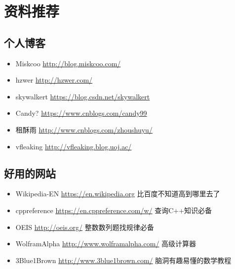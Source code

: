 \chapter{资料推荐}
\section{个人博客}
\begin{itemize}
	\item Miskcoo \url{http://blog.miskcoo.com/}
	\item hzwer \url{http://hzwer.com/}
    \item skywalkert \url{https://blog.csdn.net/skywalkert}
    \item Candy? \url{https://www.cnblogs.com/candy99}
    \item 租酥雨 \url{http://www.cnblogs.com/zhoushuyu/}
    \item vfleaking \url{http://vfleaking.blog.uoj.ac/}
\end{itemize}
\section{好用的网站}
\begin{itemize}
    \item Wikipedia-EN \url{https://en.wikipedia.org} 比百度不知道高到哪里去了
    \item cppreference \url{https://en.cppreference.com/w/} 查询C++知识必备
    \item OEIS \url{http://oeis.org/} 整数数列题找规律必备
    \item WolframAlpha \url{http://www.wolframalpha.com/} 高级计算器
    \item 3Blue1Brown \url{http://www.3blue1brown.com/} 脑洞有趣易懂的数学教程
\end{itemize}
